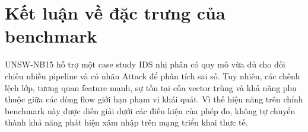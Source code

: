 \section{Kết luận về đặc trưng của benchmark}
UNSW-NB15 hỗ trợ một case study IDS nhị phân có quy mô vừa đủ cho đối chiếu nhiều pipeline và có nhãn Attack để phân tích sai số. Tuy nhiên, các chênh lệch lớp, tương quan feature mạnh, sự tồn tại của vector trùng và khả năng phụ thuộc giữa các dòng flow giới hạn phạm vi khái quát. Vì thế hiệu năng trên chính benchmark này được diễn giải dưới các điều kiện của phép đo, không tự chuyển thành khả năng phát hiện xâm nhập trên mạng triển khai thực tế.
